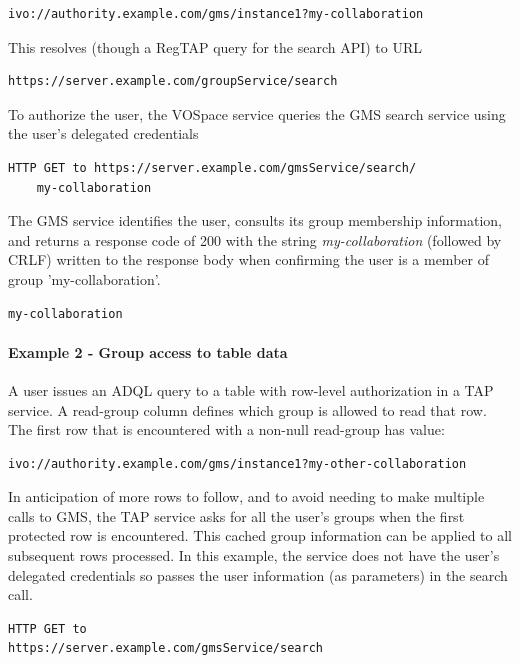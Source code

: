 \documentclass[11pt,a4paper]{ivoa}
\begin{document}
\begin{verbatim}
ivo://authority.example.com/gms/instance1?my-collaboration
\end{verbatim}

This resolves (though a RegTAP query for the search API) to URL

\begin{verbatim}
https://server.example.com/groupService/search
\end{verbatim}

To authorize the user, the VOSpace service queries the GMS search service using the user's delegated credentials

\begin{verbatim}
HTTP GET to https://server.example.com/gmsService/search/
    my-collaboration
\end{verbatim}

The GMS service identifies the user, consults its group membership information, and returns a response code of 200 with the string \emph{my-collaboration} (followed by CRLF) written to the response body when confirming the user is a member of group 'my-collaboration'.

\begin{verbatim}
my-collaboration
\end{verbatim}

\paragraph{Example 2 - Group access to table data}

A user issues an ADQL query to a table with row-level authorization in a TAP service.  A read-group column defines which group is allowed to read that row.  The first row that is encountered with a non-null read-group has value:

\begin{verbatim}
ivo://authority.example.com/gms/instance1?my-other-collaboration
\end{verbatim}

In anticipation of more rows to follow, and to avoid needing to make multiple calls to GMS, the TAP service asks for all the user's groups when the first protected row is encountered.  This cached group information can be applied to all subsequent rows processed.  In this example, the service does not have the user's delegated credentials so passes the user information (as parameters) in the search call.

\begin{verbatim}
HTTP GET to
https://server.example.com/gmsService/search
\end{verbatim}
\end{document}
